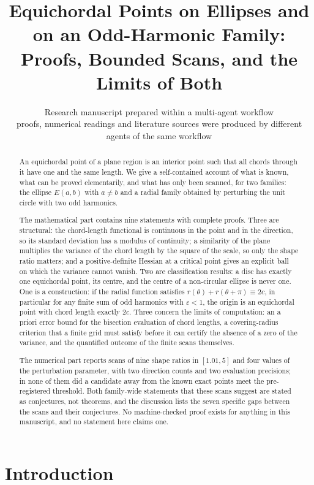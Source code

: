 \documentclass[11pt]{article}
\title{Equichordal Points on Ellipses and on an Odd-Harmonic Family:\\
Proofs, Bounded Scans, and the Limits of Both}
\author{Research manuscript prepared within a multi-agent workflow\\
\small proofs, numerical readings and literature sources were produced by different agents of the same workflow}
\date{}
\theoremstyle{definition}
\theoremstyle{remark}
\begin{document}
\maketitle

\begin{abstract}
An equichordal point of a plane region is an interior point such that all chords through it have one and the same
length. We give a self-contained account of what is known, what can be proved elementarily, and what has only
been scanned, for two families: the ellipse $E(a,b)$ with $a\neq b$ and a radial family obtained by perturbing the
unit circle with two odd harmonics.

The mathematical part contains nine statements with complete proofs. Three are structural: the chord-length
functional is continuous in the point and in the direction, so its standard deviation has a modulus of
continuity; a similarity of the plane multiplies the variance of the chord length by the square of the scale,
so only the shape ratio matters; and a positive-definite Hessian at a critical point gives an explicit ball on
which the variance cannot vanish. Two are classification results: a disc has exactly one equichordal point,
its centre, and the centre of a non-circular ellipse is never one. One is a construction: if the radial function
satisfies $r(\theta)+r(\theta+\pi)\equiv 2c$, in particular for any finite sum of odd harmonics with
$\varepsilon<1$, the origin is an equichordal point with chord length exactly $2c$. Three concern the limits of
computation: an a priori error bound for the bisection evaluation of chord lengths, a covering-radius criterion
that a finite grid must satisfy before it can certify the absence of a zero of the variance, and the quantified
outcome of the finite scans themselves.

The numerical part reports scans of nine shape ratios in $[1.01,5]$ and four values of the perturbation
parameter, with two direction counts and two evaluation precisions; in none of them did a candidate away from
the known exact points meet the pre-registered threshold. Both family-wide statements that these scans suggest
are stated as conjectures, not theorems, and the discussion lists the seven specific gaps between the scans and
their conjectures. No machine-checked proof exists for anything in this manuscript, and no statement here
claims one.
\end{abstract}

\section{Introduction}
\end{document}
